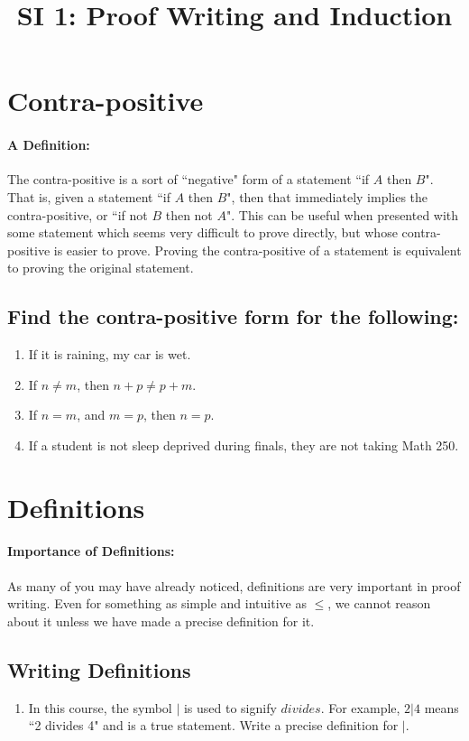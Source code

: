 \documentclass[12pt]{article}
\date{}
\author{}
\title{SI 1: Proof Writing and Induction}
\begin{document}
	\maketitle
	\section{Contra-positive}
	\paragraph{A Definition: } The contra-positive is a sort of ``negative" form of a statement ``if $A$ then $B$". That is, given a statement ``if $A$ then $B$", then that immediately implies the contra-positive, or ``if not $B$ then not $A$". This can be useful when presented with some statement which seems very difficult to prove directly, but whose contra-positive is easier to prove. Proving the contra-positive of a statement is equivalent to proving the original statement.
		\subsection{Find the contra-positive form for the following:}
		\begin{enumerate}
		\item If it is raining, my car is wet.
		\item If $n\neq m$, then $n+p\neq p+m$.
		\item If $n=m$, and $m=p$, then $n=p$.
		\item If a student is not sleep deprived during finals, they are not taking Math 250.
		\end{enumerate}
	\section{Definitions}
		\paragraph{Importance of Definitions: } As many of you may have already noticed, definitions are very important in proof writing. Even for something as simple and intuitive as $\leq$, we cannot reason about it unless we have made a precise definition for it.

		\subsection{Writing Definitions}
		\begin{enumerate}[resume]
			\item In this course, the symbol $|$ is used to signify $divides$. For example, $2|4$ means ``2 divides 4" and is a true statement. Write a precise definition for $|$.
		\end{enumerate}
\end{document}
